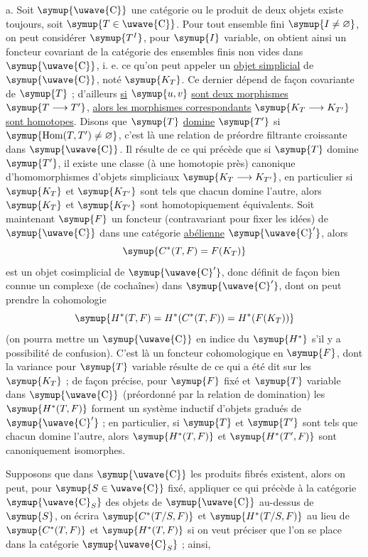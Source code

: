 \medskip\noindent
a. Soit $\symup{\text{\uwave{C}}}$ une catégorie ou le produit de deux objets existe toujours,
soit $\symup{T\in\text{\uwave{C}}}$. Pour tout ensemble fini $\symup{I\ne\varnothing}$, on peut
considérer $\symup{T^I}$, pour $\symup{I}$ variable, on obtient ainsi un foncteur covariant de
la catégorie des ensembles finis non vides dans $\symup{\text{\uwave{C}}}$, i. e. ce qu'on
peut appeler un \uline{objet simplicial} de $\symup{\text{\uwave{C}}}$, noté $\symup{K_T}$. Ce dernier
dépend de façon covariante de $\symup{T}$ ; d'ailleurs \uline{si} $\symup{u,v}$ \uline{sont deux morphismes}
$\symup{T\longrightarrow T'}$, \uline{alors les morphismes correspondants}
$\symup{K_T\longrightarrow K_{T'}}$ \uline{sont homotopes}. Disons que $\symup{T}$ \uline{domine} $\symup{T'}$
si $\symup{\operatorname{Hom}(T,T')\ne\varnothing}$, c'est là une relation de préordre
filtrante croissante dans $\symup{\text{\uwave{C}}}$. Il résulte de ce qui précède que si $\symup{T}$
domine $\symup{T'}$, il existe une classe (à une homotopie près) canonique
d'homomorphismes d'objets simpliciaux $\symup{K_T\longrightarrow K_{T'}}$, en
particulier si $\symup{K_T}$ et $\symup{K_{T'}}$ sont tels que chacun domine l'autre, alors
$\symup{K_T}$ et $\symup{K_{T'}}$ sont homotopiquement équivalents. Soit maintenant $\symup{F}$ un
foncteur (contravariant pour fixer les idées) de $\symup{\text{\uwave{C}}}$ dans une catégorie
\uline{abélienne} $\symup{\text{\uwave{C}}'}$, alors
\[
  \symup{C^*(T,F)=F(K_T)}
\]
est un objet cosimplicial de $\symup{\text{\uwave{C}}'}$, donc définit de façon bien connue
un complexe (de cochaînes) dans $\symup{\text{\uwave{C}}'}$, dont on peut prendre la
cohomologie
\[
  \symup{H^*(T,F)=H^*(C^*(T,F))=H^*(F(K_T))}
\]
(on pourra mettre un $\symup{\text{\uwave{C}}}$ en indice du $\symup{H^*}$ s'il y a possibilité de
confusion). C'est là un foncteur cohomologique en $\symup{F}$, dont la variance pour $\symup{T}$
variable résulte de ce qui a été dit sur les $\symup{K_T}$ ; de façon précise, pour $\symup{F}$
fixé et $\symup{T}$ variable dans $\symup{\text{\uwave{C}}}$ (préordonné par la relation de
domination) les $\symup{H^*(T,F)}$ forment un système inductif d'objets gradués de
$\symup{\text{\uwave{C}}'}$ ; en particulier, si $\symup{T}$ et $\symup{T'}$ sont tels que chacun domine
l'autre, alors $\symup{H^*(T,F)}$ et $\symup{H^*(T',F)}$ sont canoniquement isomorphes.

Supposons que dans $\symup{\text{\uwave{C}}}$ les produits fibrés existent, alors on peut,
pour $\symup{S\in\text{\uwave{C}}}$ fixé, appliquer ce qui précède à la catégorie
$\symup{\text{\uwave{C}}_S}$ des objets de $\symup{\text{\uwave{C}}}$ au-dessus de $\symup{S}$, on écrira
$\symup{C^*(T/S,F)}$ et $\symup{H^*(T/S,F)}$ au lieu de $\symup{C^*(T,F)}$ et $\symup{H^*(T,F)}$ si on veut
préciser que l'on se place dans la catégorie $\symup{\text{\uwave{C}}_S}$ ; ainsi,

